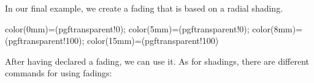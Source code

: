 \begin{command}{\pgfdeclarefading{}}
    In our final example, we create a fading that is based on a radial shading.
\begin{codeexample}[]
{
  color(0mm)=(pgftransparent!0);
  color(5mm)=(pgftransparent!0);
  color(8mm)=(pgftransparent!100);
  color(15mm)=(pgftransparent!100)
}
\end{codeexample}
\end{command}

After having declared a fading, we can use it. As for shadings, there are
different commands for using fadings:

